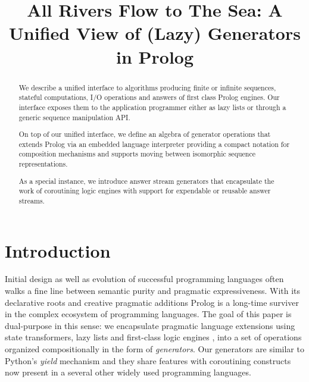 \documentclass{new_tlp}
\begin{document}
\title[A Unified View of (Lazy) Generators in Prolog]{All Rivers Flow to The Sea: A Unified View of (Lazy) Generators in Prolog}

\begin{comment}
 \author[Paul Tarau]
         {%
          Paul Tarau\\
          Dept. of Computer Science and Engineering \\ University of North Texas\\
          1155 Union Circle, Denton, Texas 76203, USA}
\end{comment}

\maketitle

\begin{abstract}
We describe a unified interface to algorithms producing finite or infinite sequences, stateful computations, I/O operations and answers of first class Prolog engines. Our interface exposes them to the application programmer either as lazy lists or through a generic sequence manipulation API.

On top of our unified interface, we define an algebra of generator operations that extends Prolog via an embedded language interpreter providing a compact notation for composition mechanisms and supports moving between isomorphic sequence representations.

As a special instance, we introduce answer stream generators that 
encapsulate the work of coroutining logic engines with support 
for expendable or reusable answer streams.

\end{abstract}

\section{Introduction}

Initial design as well as evolution of successful programming languages often walks a fine line between semantic purity and pragmatic expressiveness. With its declarative roots and creative pragmatic additions Prolog is a long-time surviver in the complex ecosystem of programming languages. The goal of this paper is dual-purpose in this sense: we encapsulate pragmatic language extensions using
state transformers, lazy lists and first-class logic engines \cite{tarau:parimp99,tarau:cl2000,iclp08:inter,ciclops08:pINTER,bp2011},
into a set of operations organized compositionally in the form of {\em 
generators}.
Our generators are similar to Python's {\em yield} mechanism \cite{} and 
they share features with coroutining constructs now present in a several other widely used programming languages.
\end{document}
